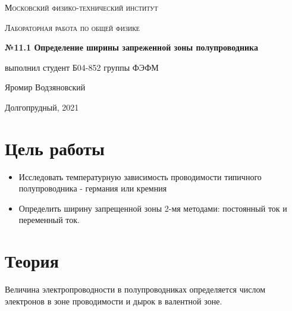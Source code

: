 \documentclass[a4paper]{article}
\begin{document}
\graphicspath{ {pictures/} }

\begin{titlepage}
	\centering
	\vspace{5cm}
    {\scshape\LARGE Московский физико-технический институт\par}
	\vspace{5cm}
	{\scshape\Large Лабораторная работа по общей физике \par}
	\vspace{1cm}
    {\huge\bfseries  №11.1 Определение ширины запреженной зоны полупроводника  \par}
	\vspace{1cm}
	\vfill
    \begin{flushright}
        {\large выполнил студент Б04-852 группы ФЭФМ}\par
        \vspace{0.3cm}
        {\LARGE Яромир Водзяновский}
    \end{flushright}
	\vfill
Долгопрудный, 2021
\end{titlepage}

\pagestyle{fancy} 
\fancyhead[C]{}
\fancyfoot[C]{ \noindent\rule{\textwidth}{0.4pt} \thepage }

\tableofcontents

\newpage



\section{Цель работы}

\begin{itemize}
    
\item Исследовать температурную зависимость проводимости типичного полупроводника - германия или кремния
\item Определить ширину запрещенной зоны 2-мя методами: постоянный ток и переменный ток.
\end{itemize}



\section{Теория}

Величина электропроводности в полупроводниках определяется числом электронов в зоне проводимости и дырок в 
валентной зоне. \par 
\end{document}
